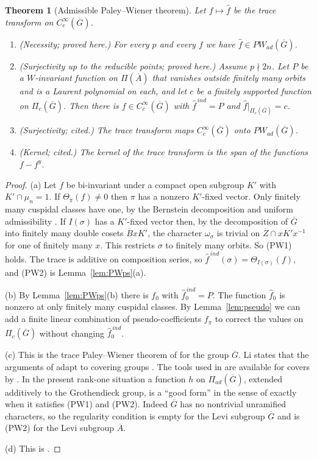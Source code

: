 \documentclass[12pt,letterpaper]{article}
\numberwithin{equation}{section}
\newtheorem{theorem}{Theorem}[section]
\theoremstyle{definition}
\newcommand{\proved}{proved here}
\newcommand{\cited}{cited}
\newcommand{\bG}{\overline{G}}
\newcommand{\bA}{\overline{A}}
\newcommand{\bB}{\overline{B}}
\newcommand{\bZ}{\overline{Z}}
\newcommand{\Pia}{\Pi_{ad}(\bG)}
\begin{document}
\begin{theorem}[Admissible Paley--Wiener theorem]\label{thm:PWad}
Let $f\mapsto\hat f$ be the trace transform on $C_c^\infty(\bG)$.
\begin{enumerate}[label=(\alph*),leftmargin=*,itemsep=1pt]
\item (Necessity; \proved.)  For every $p$ and every $f$ we have $\hat f\in PW_{ad}(\bG)$.
\item (Surjectivity up to the reducible points; \proved.)  Assume $p\nmid2n$.  Let $P$ be a
$W$-invariant function on $\Pi(\bA)$ that vanishes outside finitely many orbits and is a
Laurent polynomial on each, and let $c$ be a finitely supported function on $\Pi_c(\bG)$.
Then there is $f\in C_c^\infty(\bG)$ with $\hat f^{\,ind}=P$ and $\hat f|_{\Pi_c(\bG)}=c$.
\item (Surjectivity; \cited.)  The trace transform maps $C_c^\infty(\bG)$ onto
$PW_{ad}(\bG)$.
\item (Kernel; \cited.)  The kernel of the trace transform is the span of the functions
$f-f^y$.
\end{enumerate}
\end{theorem}
\begin{proof}
(a) Let $f$ be bi-invariant under a compact open subgroup $K'$ with $K'\cap\mu_n=1$.  If
$\Theta_\pi(f)\ne0$ then $\pi$ has a nonzero $K'$-fixed vector.  Only finitely many
cuspidal classes have one, by the Bernstein decomposition and uniform admissibility
\cite[Theorems~3.4 and 3.9]{KS23}.  If $I(\sigma)$ has a $K'$-fixed vector then, by the
decomposition of $\bG$ into finitely many double cosets $\bB xK'$, the character
$\omega_\sigma$ is trivial on $\bZ\cap xK'x^{-1}$ for one of finitely many $x$.  This
restricts $\sigma$ to finitely many orbits.  So (PW1) holds.  The trace is additive on
composition series, so $\hat f^{\,ind}(\sigma)=\Theta_{I(\sigma)}(f)$, and (PW2) is
Lemma~\ref{lem:PWps}(a).

(b) By Lemma~\ref{lem:PWps}(b) there is $f_0$ with $\hat f_0^{\,ind}=P$.  The function
$\hat f_0$ is nonzero at only finitely many cuspidal classes.  By Lemma~\ref{lem:pseudo}
we can add a finite linear combination of pseudo-coefficients $f_\pi$ to correct the
values on $\Pi_c(\bG)$ without changing $\hat f_0^{\,ind}$.

(c) This is the trace Paley--Wiener theorem of \cite{BDK86} for the group $\bG$.  Li
states that the arguments of \cite{BDK86} adapt to covering groups
\cite[\S3.4]{Li14}.  The tools used in \cite{BDK86} are available for covers by
\cite{KS23}.  In the present rank-one situation a function $h$ on $\Pia$, extended
additively to the Grothendieck group, is a ``good form'' in the sense of \cite{BDK86}
exactly when it satisfies (PW1) and (PW2).  Indeed $\bG$ has no nontrivial unramified
characters, so the regularity condition is empty for the Levi subgroup $\bG$ and is
(PW2) for the Levi subgroup $\bA$.

(d) This is \cite[Th\'eor\`eme~5.8.10]{Li12}.
\end{proof}
\end{document}
